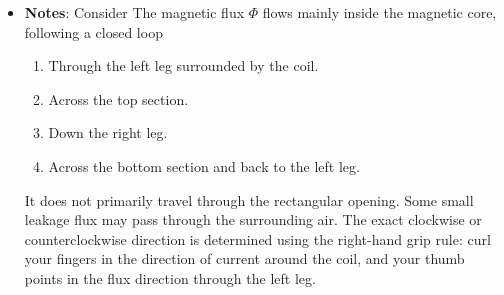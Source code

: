 \documentclass{report}
\begin{document}
\begin{itemize}
\begin{itemize}
                    \begin{align*}
                        F = \Phi R
                    .\end{align*}
                \item \textbf{Magnetizing force}: The magnetizing force ($H$), also known as magnetic field intensity, is the external magnetic field strength applied to a material to induce magnetic flux or align internal magnetic domains
                    \begin{align*}
                       H = \frac{NI}{l} 
                    \end{align*}
                    Where $I$ is current, $N$ is the number of coil turns, and $l$ is the length of the magnetic circuit. 
                    \bigbreak \noindent 
                    Measured in amp-turns per meter ($\frac{At}{m}$)
                \item \textbf{Magnetizing force vs magnetomotive force}: Magnetomotive force (MMF) is the total "pressure" or driving potential that creates magnetic flux in a magnetic circuit, while magnetizing force (\(H\)) is the magnetomotive force distributed per unit length of the magnetic path (also called magnetic field strength).
            \end{itemize}
        \item \textbf{Notes}: Consider
            \bigbreak \noindent 
            \bigbreak \noindent 
            The magnetic flux \(\Phi\) flows mainly inside the magnetic core, following a closed loop
            \begin{enumerate}
                \item Through the left leg surrounded by the coil.
                \item Across the top section.
                \item Down the right leg.
                \item Across the bottom section and back to the left leg.
            \end{enumerate}
            \bigbreak \noindent 
            It does not primarily travel through the rectangular opening. Some small leakage flux may pass through the surrounding air.
            \bigbreak \noindent 
            The exact clockwise or counterclockwise direction is determined using the right-hand grip rule: curl your fingers in the direction of current around the coil, and your thumb points in the flux direction through the left leg.
            \bigbreak \noindent 

\end{itemize}
\end{document}
